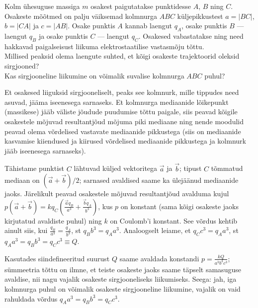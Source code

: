 
Kolm ühesuguse massiga $m$ osakest paigutatakse punktidesse $A$, $B$ ning $C$. Osakeste mõõtmed on palju väiksemad kolmnurga $ABC$ küljepikkustest $a=|BC|$, $b=|CA|$ ja $c=|AB|$. Osake punktis $A$ kannab laengut $q_A$, osake punktis $B$ --- laengut $q_B$ ja osake punktis $C$ --- laengut $q_C$. Osakesed vabastatakse ning need hakkavad paigalseisust liikuma elektrostaatilise vastasmõju tõttu.\\
\osa Millised peaksid olema laengute suhted, et kõigi osakeste trajektoorid oleksid sirgjooned?\\
\osa Kas sirgjooneline liikumine on võimalik suvalise kolmnurga $ABC$ puhul?


\hint

\solu
Et osakesed liiguksid sirgjooneliselt, peaks see kolmnurk, mille tippudes need asuvad, jääma iseenesega sarnaseks. Et kolmnurga mediaanide lõikepunkt (massikese) jääb väliste jõudude puudumise tõttu paigale, siis peavad kõigile osakestele mõjuvad resultantjõud mõjuma piki mediaane ning nende moodulid peavad olema võrdelised vastavate mediaanide pikkustega (siis on mediaanide kasvamise kiiendused ja kiirused võrdelised mediaanide pikkustega ja kolmnurk jääb iseenesega sarnaseks).

Tähistame punktist $C$ lähtuvad küljed vektoritega $\vec a$ ja $\vec b$; tipust $C$ tõmmatud mediaan on $(\vec a+\vec b)/2$; sarnased avaldised saame ka ülejäänud mediaanide jaoks. Järelikult peavad osakestele mõjuvad resultantjõud avalduma kujul $p(\vec a+\vec b)=kq_C(\frac {\vec aq_B}{a^3}+\frac {\vec bq_A}{b^3})$, kus $p$ on konstant (sama kõigi osakeste jaoks kirjutatud avaldiste puhul) ning $k$ on Coulomb'i konstant. See võrdus kehtib ainult siis, kui $\frac {q_B}{a^3}=\frac {q_A}{b^3}$, st $q_Bb^3=q_Aa^3$. Analoogselt leiame, et  $q_Cc^3=q_Aa^3$, st $q_Aa^3=q_Bb^3=q_Cc^3\equiv Q$.

Kasutades siindefineeritud suurust  $Q$ saame avaldada konstandi $p=\frac {kQ}{a^3b^3c^3}$; sümmeetria tõttu on ilmne, et teiste osakeste jaoks saame täpselt samasuguse avaldise, nii nagu vajalik osakeste sirgjooneliseks liikumiseks. Seega: jah, iga kolmnurga puhul on võimalik osakeste sirgjooneline liikumine, vajalik on vaid rahuldada võrdus $q_Aa^3=q_Bb^3=q_Cc^3$.
\probend